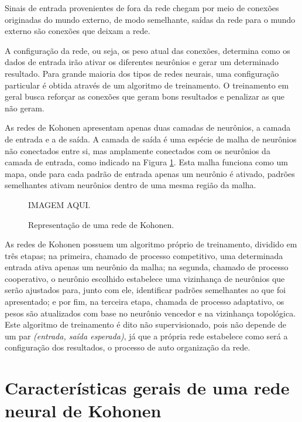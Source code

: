 Sinais de entrada provenientes de fora da rede chegam por meio de conexões
originadas do mundo externo, de modo semelhante, saídas da rede para o mundo
externo são conexões que deixam a rede.

A configuração da rede, ou seja, os peso atual das conexões, determina como os
dados de entrada irão ativar os diferentes neurônios e gerar um determinado
resultado. Para grande maioria dos tipos de redes neurais, uma configuração
particular é obtida através de um algoritmo de treinamento. O treinamento em
geral busca reforçar as conexões que geram bons resultados e penalizar as que
não geram.

As redes de Kohonen apresentam apenas duas camadas de neurônios, a camada de
entrada e a de saída. A camada de saída é uma espécie de malha de neurônios não
conectados entre si, mas amplamente conectados com os neurônios da camada de
entrada, como indicado na Figura \ref{fig:kohonen}. Esta malha funciona como um
mapa, onde para cada padrão de entrada
apenas um neurônio é ativado, padrões semelhantes ativam neurônios dentro de
uma mesma região da malha.

\begin{figure}[H]
  \begin{center}
    IMAGEM AQUI.
  \end{center}
  \caption{ Representação de uma rede de Kohonen. }
  \label{fig:kohonen}
\end{figure}

As redes de Kohonen possuem um algoritmo próprio de treinamento, dividido em
três etapas; na primeira, chamado de processo competitivo, uma determinada entrada
ativa apenas um neurônio da malha; na segunda, chamado de processo cooperativo,
o neurônio escolhido estabelece uma vizinhança de neurônios que serão ajustados
para, junto com ele, identificar padrões semelhantes ao que foi apresentado; e
por fim, na terceira etapa, chamada de processo adaptativo, os pesos são
atualizados com base no neurônio vencedor e na vizinhança topológica. Este
algoritmo de treinamento é dito não supervisionado, pois não depende de um
par \textit{(entrada, saída esperada)}, já que a própria rede estabelece como
será a configuração dos resultados, o processo de auto organização da rede.

\section{Características gerais de uma rede neural de Kohonen}\label{sec:caracteristicas_rede_kohonen}

